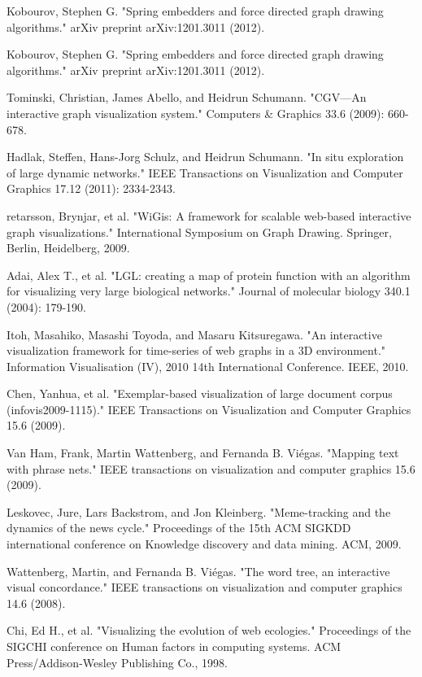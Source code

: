 \begin{thebibliography}{99}
 Kobourov, Stephen G. "Spring embedders and force directed graph drawing algorithms." arXiv preprint arXiv:1201.3011 (2012).

 Kobourov, Stephen G. "Spring embedders and force directed graph drawing algorithms." arXiv preprint arXiv:1201.3011 (2012).

 Tominski, Christian, James Abello, and Heidrun Schumann. "CGV—An interactive graph visualization system." Computers \& Graphics 33.6 (2009): 660-678.

 Hadlak, Steffen, Hans-Jorg Schulz, and Heidrun Schumann. "In situ exploration of large dynamic networks." IEEE Transactions on Visualization and Computer Graphics 17.12 (2011): 2334-2343.

 retarsson, Brynjar, et al. "WiGis: A framework for scalable web-based interactive graph visualizations." International Symposium on Graph Drawing. Springer, Berlin, Heidelberg, 2009.

 Adai, Alex T., et al. "LGL: creating a map of protein function with an algorithm for visualizing very large biological networks." Journal of molecular biology 340.1 (2004): 179-190.

 Itoh, Masahiko, Masashi Toyoda, and Masaru Kitsuregawa. "An interactive visualization framework for time-series of web graphs in a 3D environment." Information Visualisation (IV), 2010 14th International Conference. IEEE, 2010.

 Chen, Yanhua, et al. "Exemplar-based visualization of large document corpus (infovis2009-1115)." IEEE Transactions on Visualization and Computer Graphics 15.6 (2009).

 Van Ham, Frank, Martin Wattenberg, and Fernanda B. Viégas. "Mapping text with phrase nets." IEEE transactions on visualization and computer graphics 15.6 (2009).

 Leskovec, Jure, Lars Backstrom, and Jon Kleinberg. "Meme-tracking and the dynamics of the news cycle." Proceedings of the 15th ACM SIGKDD international conference on Knowledge discovery and data mining. ACM, 2009.

 Wattenberg, Martin, and Fernanda B. Viégas. "The word tree, an interactive visual concordance." IEEE transactions on visualization and computer graphics 14.6 (2008).

 Chi, Ed H., et al. "Visualizing the evolution of web ecologies." Proceedings of the SIGCHI conference on Human factors in computing systems. ACM Press/Addison-Wesley Publishing Co., 1998.


\end{thebibliography}
